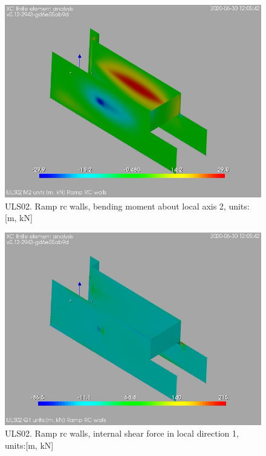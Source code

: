 \begin{figure}
\begin{center}
\includegraphics[width=\linewidth]{ramp_wall/resLC/text/graphics/resSimplLC/lULS02wallsM2}
\caption{ULS02. Ramp rc walls, bending moment about local axis 2, units:[m, kN]}
\end{center}
\end{figure}
\begin{figure}
\begin{center}
\includegraphics[width=\linewidth]{ramp_wall/resLC/text/graphics/resSimplLC/lULS02wallsQ1}
\caption{ULS02. Ramp rc walls, internal shear force in local direction 1, units:[m, kN]}
\end{center}
\end{figure}
